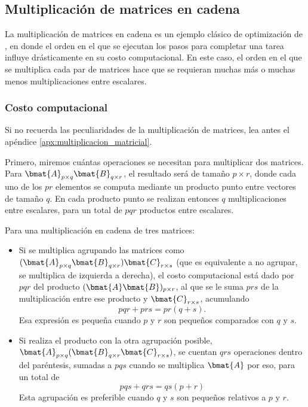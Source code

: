 \subsection{Multiplicación de matrices en cadena}

La multiplicación de matrices en cadena es un ejemplo clásico de optimización de , en donde el orden en el que se ejecutan los pasos para completar una tarea influye drásticamente en su costo computacional. En este caso, el orden en el que se multiplica cada par de matrices hace que se requieran muchas más o muchas menos multiplicaciones entre escalares.

\subsubsection{Costo computacional}

\begin{tip}
  Si no recuerda las peculiaridades de la multiplicación de matrices, lea antes el apéndice \ref{apx:multiplicacion_matricial}.
\end{tip}

Primero, miremos cuántas operaciones se necesitan para multiplicar dos matrices. Para \(\bmat{A}_{p\times q} \bmat{B}_{q \times r}\), el resultado será de tamaño \(p\times r\), donde cada uno de los \(pr\) elementos se computa mediante un producto punto entre vectores de tamaño \(q\). En cada producto punto se realizan entonces \(q\) multiplicaciones entre escalares, para un total de \(pqr\) productos entre escalares.

Para una multiplicación en cadena de tres matrices:
\begin{itemize}
  \item Si se multiplica agrupando las matrices como \((\bmat{A}_{p\times q} \bmat{B}_{q \times r}) \bmat{C}_{r \times s}\) (que es equivalente a no agrupar, se multiplica de izquierda a derecha), el costo computacional está dado por \(pqr\) del producto \((\bmat{A}\bmat{B})_{p\times r}\), al que se le suma \(prs\) de la multiplicación entre ese producto y \(\bmat{C}_{r \times s}\), acumulando \[pqr + prs = pr(q+s).\] Esa expresión es pequeña cuando \(p\) y \(r\) son pequeños comparados con \(q\) y \(s\).
  \item Si realiza el producto con la otra agrupación posible, \(\bmat{A}_{p\times q} (\bmat{B}_{q \times r} \bmat{C}_{r \times s})\), se cuentan \(qrs\) operaciones dentro del paréntesis, sumadas a \(pqs\) cuando se multiplica \(\bmat{A}\) por eso, para un total de \[pqs + qrs = qs(p+r)\] Esta agrupación es preferible cuando \(q\) y \(s\) son pequeños relativos a \(p\) y \(r\).
\end{itemize}
   
